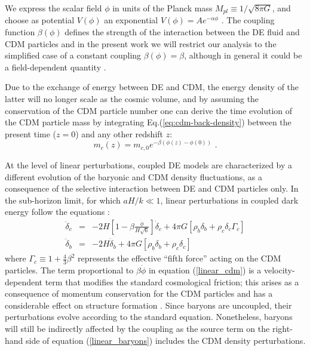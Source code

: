 We express the scalar field $\phi$ in units of the Planck
mass $M_{pl}\equiv1/\sqrt{8\pi G}$, and choose as potential $V(\phi)$
an exponential $V(\phi)=Ae^{-\alpha\phi}$ \citep{Lucchin_Matarrese_1984,Wetterich_1988}.
The coupling function $\beta(\phi)$ defines the strength of the interaction
between the DE fluid and CDM particles and in the present work we
will restrict our analysis to the simplified case of a constant coupling
$\beta(\phi)=\beta$, although in general it could be a field-dependent
quantity \cite{Amendola_2004,Baldi_2011a}.

Due to the exchange of energy between DE and CDM, the energy density
of the latter will no longer scale as the cosmic volume, and by assuming
the conservation of the CDM particle number one can derive the time
evolution of the CDM particle mass by integrating Eq.(\ref{eq:cdm-back-density})
between the present time ($z=0$) and any other redshift $z$:
\begin{equation}
m_{c}(z)=m_{c,0}e^{-\beta(\phi(z)-\phi(0))}\,\,.
\end{equation}


At the level of linear perturbations, coupled DE models are characterized
by a different evolution of the baryonic and CDM density fluctuations,
as a consequence of the selective interaction between DE and CDM particles
only. In the sub-horizon limit, for which $aH/k\ll1$, linear perturbations
in coupled dark energy follow the equations \citep{Amendola_2004,pettorino_baccigalupi_2008}:
\begin{eqnarray}
\ddot{\delta}_{c} & = & -2H\left[1-\beta\frac{\dot{\phi}}{H\sqrt{6}}\right]\dot{\delta}_{c}+4\pi G\left[\rho_{b}\delta_{b}+\rho_{c}\delta_{c}\Gamma_{c}\right]\label{linear_cdm}\\
\ddot{\delta}_{b} & = & -2H\dot{\delta}_{b}+4\pi G\left[\rho_{b}\delta_{b}+\rho_{c}\delta_{c}\right]\label{linear_baryons}
\end{eqnarray}
where $\Gamma_{c}\equiv1+\frac{4}{3}\beta^{2}$ represents the effective
``fifth force'' acting on the CDM particles. The term proportional
to $\beta\dot{\phi}$ in equation (\ref{linear_cdm}) is a velocity-dependent
term that modifies the standard cosmological friction; this arises
as a consequence of momentum conservation for the CDM particles and
has a considerable effect on structure formation \citep{baldi_etal_2010,baldi_clarifying_2011,Li_Barrow_2011}.
Since baryons are uncoupled, their perturbations evolve according
to the standard equation. Nonetheless, baryons will still be indirectly
affected by the coupling as the source term on the right-hand side
of equation (\ref{linear_baryons}) includes the CDM density perturbations.

